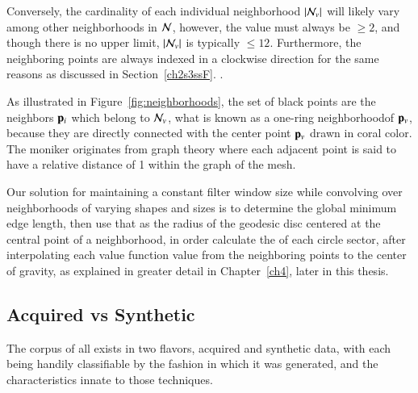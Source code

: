 Conversely, the cardinality of each individual neighborhood $|\mathcal{N}_v|$ will likely vary among other neighborhoods in $\mathcal{N}$, however, the value must always be $\geq 2$, and though there is no upper limit, $|\mathcal{N}_v|$ is typically $\leq 12$. Furthermore, the neighboring points are always indexed in a clockwise direction for the same reasons as discussed in Section~\ref{ch2s3ssF}.
.%

As illustrated in Figure~\ref{fig:neighborhoods}, the set of black points are the neighbors $\mathbf{p}_i$ which belong to $\mathcal{N}_v$, what is known as a one-ring neighborhood\footnotemark of $\mathbf{p}_v$, because they are directly connected with the center point $\mathbf{p}_v$ drawn in coral color. The moniker originates from graph theory where each adjacent point is said to have a relative distance of 1 within the graph of the mesh. 

Our solution for maintaining a constant filter window size while convolving  over neighborhoods of varying shapes and sizes is to determine the global minimum edge length, then use that as the radius of the geodesic disc centered at the central point of a neighborhood, in order calculate the  of each circle sector, after interpolating each value function value from the neighboring points to the center of gravity, as explained in greater detail in Chapter~\ref{ch4}, later in this thesis.

%
%
%
%
\subsection{Acquired vs Synthetic \tdd{}}
\label{ch2s3ssAVS3}
The corpus of all \tdd{} exists in two flavors, acquired and synthetic data, with each being handily classifiable by the fashion in which it was generated, and the characteristics innate to those techniques.

